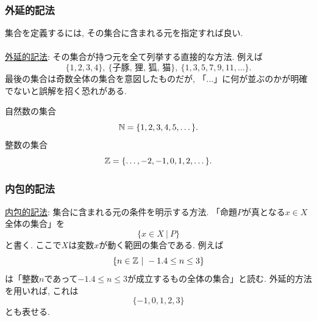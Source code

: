 

\begin{frame}
\frametitle{外延的記法} 

集合を定義するには, その集合に含まれる元を指定すれば良い. \\
\ \\

\underline{外延的記法}: その集合が持つ元を全て列挙する直接的な方法. 例えば
$$
\{1,2,3,4\}, \ \{\text{子豚, 狸, 狐, 猫}\}, \ \{1,3,5,7,9,11,\dots\}. 
$$
最後の集合は奇数全体の集合を意図したものだが, 「$\dots$」に何が並ぶのかが明確でないと誤解を招く恐れがある. 


\begin{Ex}
自然数の集合
$$
\mathbb{N}=\{1,2,3,4,5,\dots\}. 
$$
整数の集合
$$
\mathbb{Z}=\{\dots, -2,-1,0,1,2,\dots\}. 
$$
\end{Ex}

\end{frame}



\begin{frame}
\frametitle{内包的記法}   

 \underline{内包的記法}: 集合に含まれる元の条件を明示する方法. 
「命題$P$が真となる$x \in X$全体の集合」を
$$
\{ x \in X \ | \ P\}
$$
と書く. 
ここで$X$は変数$x$が動く範囲の集合である.  
例えば
$$
\{n \in \mathbb{Z} \ | \ -1.4 \le n \le 3\}
$$
は「整数$n$であって$-1.4 \le n \le 3$が成立するもの全体の集合」と読む. 
外延的方法を用いれば, これは
$$
\{-1,0,1,2,3\}
$$
とも表せる. 

\end{frame}





